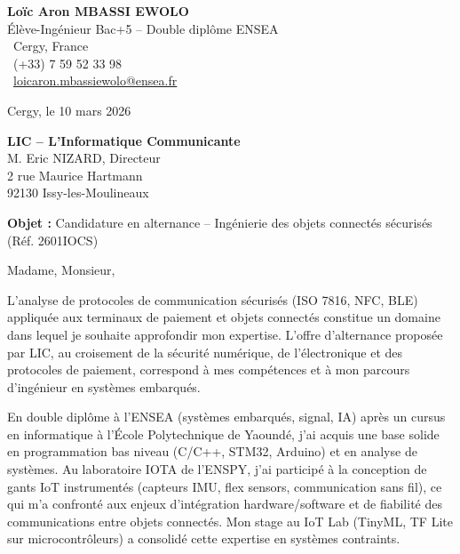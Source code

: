 \documentclass[a4paper,11pt]{article}
\begin{document}
\noindent
\begin{minipage}[t]{0.5\textwidth}
    \textbf{Loïc Aron MBASSI EWOLO}\\
    Élève-Ingénieur Bac+5 -- Double diplôme ENSEA\\[3pt]
    \faMapMarker\ Cergy, France\\
    \faPhone\ (+33) 7 59 52 33 98\\
    \faEnvelope\ \href{mailto:loicaron.mbassiewolo@ensea.fr}{loicaron.mbassiewolo@ensea.fr}
\end{minipage}
\hfill
\begin{minipage}[t]{0.4\textwidth}
    \raggedleft
    Cergy, le 10 mars 2026
\end{minipage}

\vspace{1.2cm}

\hfill
\begin{minipage}[t]{0.5\textwidth}
    \raggedleft
    \textbf{LIC -- L'Informatique Communicante}\\
    M. Eric NIZARD, Directeur\\
    2 rue Maurice Hartmann\\
    92130 Issy-les-Moulineaux
\end{minipage}

\vspace{1cm}

\noindent\textbf{Objet :} Candidature en alternance -- Ingénierie des objets connectés sécurisés (Réf. 2601IOCS)

\vspace{0.8cm}

Madame, Monsieur,

L'analyse de protocoles de communication sécurisés (ISO 7816, NFC, BLE) appliquée aux terminaux de paiement et objets connectés constitue un domaine dans lequel je souhaite approfondir mon expertise. L'offre d'alternance proposée par LIC, au croisement de la sécurité numérique, de l'électronique et des protocoles de paiement, correspond à mes compétences et à mon parcours d'ingénieur en systèmes embarqués.

En double diplôme à l'ENSEA (systèmes embarqués, signal, IA) après un cursus en informatique à l'École Polytechnique de Yaoundé, j'ai acquis une base solide en programmation bas niveau (C/C++, STM32, Arduino) et en analyse de systèmes. Au laboratoire IOTA de l'ENSPY, j'ai participé à la conception de gants IoT instrumentés (capteurs IMU, flex sensors, communication sans fil), ce qui m'a confronté aux enjeux d'intégration hardware/software et de fiabilité des communications entre objets connectés. Mon stage au IoT Lab (TinyML, TF Lite sur microcontrôleurs) a consolidé cette expertise en systèmes contraints.
\end{document}
